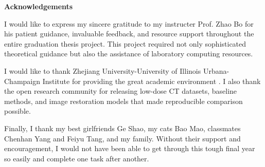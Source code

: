 \centerline{\xiaoyi\bfseries Acknowledgements}
\vspace{4em}

I would like to express my sincere gratitude to my instructer Prof. Zhao Bo for his patient guidance, invaluable feedback, and resource support throughout the entire graduation thesis project. This project required not only sophisticated theoretical guidance but also the assistance of laboratory computing resources.

I would like to thank Zhejiang University-University of Illinois Urbana-Champaign Institute for providing the great academic environment . I also thank the open research community for releasing low-dose CT datasets, baseline methods, and image restoration models that made reproducible comparison possible.

Finally, I thank my best girlfriends Ge Shao, my cats Bao Mao, classmates Chenhan Yang and Feiyu Tang, and my family. Without their support and encouragement, I would not have been able to get through this tough final year so easily and complete one task after another.